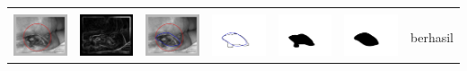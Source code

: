 \begin{table}[H]
\begin{tabular}{|m{0.7in}|m{0.7in}|m{0.7in}|m{0.7in}|m{0.7in}|m{0.7in}|m{0.7in}|}
		&  &  & & & &  \\
		\includegraphics[width=0.7in]{dataset/dataset_3/luka_hitam/ready/20_interp_init.jpg}&
		\includegraphics[width=0.7in]{dataset/dataset_3/luka_hitam/ready/20_interp_ext.jpg}&
		\includegraphics[width=0.7in]{dataset/dataset_3/luka_hitam/ready/20_interp_result.jpg}&
		\includegraphics[width=0.7in]{dataset/dataset_3/luka_hitam/ready/20_gt_r.jpg}&
		\includegraphics[width=0.7in]{dataset/dataset_3/luka_hitam/ready/20_r.jpg}&
		\includegraphics[width=0.7in]{dataset/dataset_3/luka_hitam/ready/20_interp_r.jpg}&
		berhasil\\
		\hline
		

\end{tabular}
\end{table}
